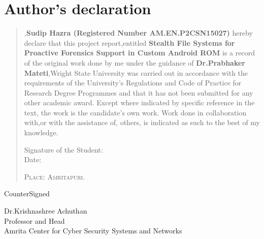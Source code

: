 %
%
%
%
%
%
\chapter*{Author's declaration}
\begin{SingleSpace}
\begin{quote}
,\textbf{Sudip Hazra (Registered Number AM.EN.P2CSN15027)} hereby declare that this project report,entitled \textbf {Stealth File Systems for Proactive Forensics Support in Custom Android ROM} is a record of the original work done by me under the guidance of \textbf{ Dr.Prabhaker Mateti},Wright State University  was carried out in accordance with the requirements of the University's Regulations and Code of Practice for Research Degree Programmes and that it has not been submitted for any other academic award. Except where indicated by specific reference in the text, the work is the candidate's own work. Work done in collaboration with,or with the assistance of, others, is indicated as such to the best of my knowledge.

\vspace{2.5cm}
\noindent

\begin{minipage}{.45\linewidth}
\begin{flushleft}
Signature of the Student:\\
Date:

\end{flushleft} 
\end{minipage}
\begin{minipage}{.45\linewidth}
\begin{flushright}
\hspace{-0.75cm}\textsc{Place: Amritapuri.}
\end{flushright}
\end{minipage}
\end{quote}
\begin{center}

CounterSigned
\bigskip
\vspace{1.5cm}

Dr.Krishnashree Achuthan\\
Professor and Head\\
Amrita Center for Cyber Security Systems and Networks
 

\end{center}
\end{SingleSpace}
\clearpage